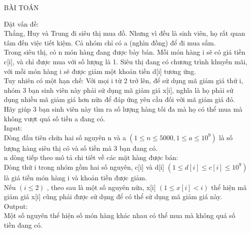 \documentclass[10pt,a4paper]{article}
\begin{document}
\begin{center}
    \fontsize{30}{30}\selectfont
    BÀI TOÁN \\
\end{center}

\begin{flushleft}
    \fontsize{14}{20}\selectfont
    Đặt vấn đề:\\
    Thắng, Huy và Trung đi siêu thị mua đồ. Nhưng vì đều là sinh viên, họ rất quan tâm đến việc tiết kiệm. Cả nhóm chỉ có a (nghìn đồng) để đi mua sắm.\\
    Trong siêu thị, có n món hàng đang được bày bán. Mỗi món hàng i sẽ có giá tiền c[i], và chỉ được mua với số lượng là 1. Siêu thị đang có chương trình khuyến mãi, với mỗi món hàng i sẽ được giảm một khoản tiền d[i] tương ứng.\\
    Tuy nhiên có một hạn chế: Với mọi i từ 2 trở lên, để sử dụng mã giảm giá thứ i, nhóm 3 bạn sinh viên này phải sử dụng mã giảm giá x[i], nghĩa là họ phải sử dụng nhiều mã giảm giá hơn nữa để đáp ứng yêu cầu đối với mã giảm giá đó.\\
    Hãy giúp 3 bạn sinh viên này tìm ra số lượng hàng tối đa mà họ có thể mua mà không vượt quá số tiền a đang có.\\
    \vspace{1 cm}
    Input:\\
    Dòng đầu tiên chứa hai số nguyên n và a $(1 \le n \le 5000, 1 \le a \le 10^9)$ là số lượng hàng siêu thị có và số tiền mà 3 bạn đang có.\\
    n dòng tiếp theo mô tả chi tiết về các mặt hàng được bán:\\
    Dòng thứ i trong nhóm gồm hai số nguyên, c[i] và d[i] $(1 \le d[i] \le c[i] \le 10^9)$ là giá tiền món hàng i và khoản tiền được giảm.\\
    Nếu $(i \le 2)$ , theo sau là một số nguyên nữa, x[i] $(1 \le x[i] < i)$ thể hiện mã giảm giá x[i] cũng phải được sử dụng để có thể sử dụng mã giảm giá này.\\
    \vspace{1 cm}
    Output:\\
    Một số nguyên thể hiện số món hàng khác nhau có thể mua mà không quá số tiền đang có.
\end{flushleft}
\end{document}
